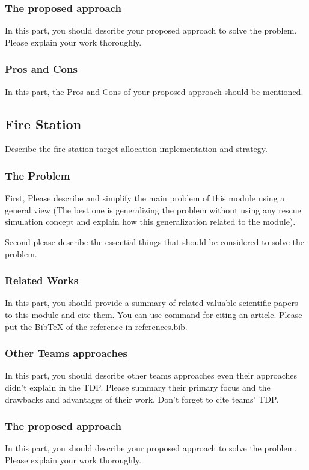 \documentclass[runningheads,a4paper]{llncs}
\begin{document}
\subsubsection{The proposed approach}
In this part, you should describe your proposed approach to solve the problem. Please explain your work thoroughly.
\subsubsection{Pros and Cons}
In this part, the Pros and Cons of your proposed approach should be mentioned.

\subsection{Fire Station}
Describe the fire station target allocation implementation and strategy.
\subsubsection{The Problem}
First, Please describe and simplify the main problem of this module using a general view (The best one is generalizing the problem without using any rescue simulation concept and explain how this generalization related to the module).

Second please describe the essential things that should be considered to solve the problem.
\subsubsection{Related Works}
In this part, you should provide a summary of related valuable scientific papers to this module and cite them. You can use command \cite{ref1} for citing an article. Please put the BibTeX of the reference in references.bib.
\subsubsection{Other Teams approaches}
In this part, you should describe other teams approaches even their approaches didn't explain in the TDP. Please summary their primary focus and the drawbacks and advantages of their work. Don't forget to cite teams' TDP.
\subsubsection{The proposed approach}
In this part, you should describe your proposed approach to solve the problem. Please explain your work thoroughly.
\end{document}
